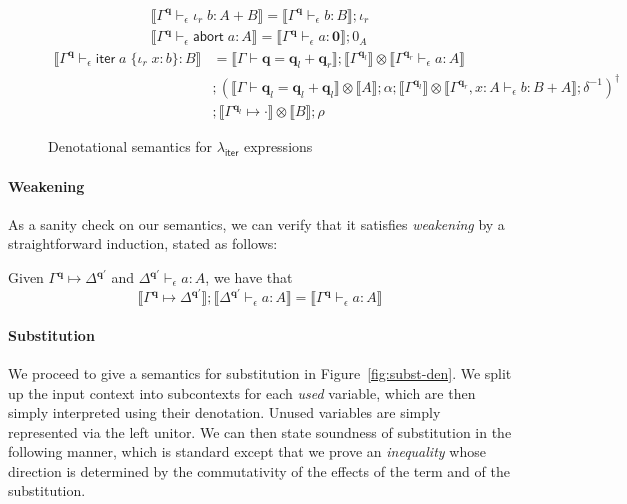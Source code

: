 \documentclass[acmsmall,screen,review]{acmart}
\newcommand{\mb}[1]{\ensuremath{\mathbf{#1}}}
\newcommand{\ms}[1]{\ensuremath{\mathsf{#1}}}
\newcommand{\lto}{:}
\newcommand{\linr}[1]{\iota_r\;{#1}}
\newcommand{\labort}[1]{\ms{abort}\;{#1}}
\newcommand{\liter}[3]{\ms{iter}\;#1\;\{ \linr{#2} \lto #3 \}}
\newcommand{\qsp}[4]{#1 \vdash #2 = #3 + #4}
\newcommand{\cwk}[2]{#1 \mapsto #2}
\newcommand{\hasty}[4]{#1 \vdash_{#2} #3: {#4}}
\newcommand{\dnt}[1]{\llbracket{#1}\rrbracket}
\newcommand{\subiterexp}{\texorpdfstring{\(\lambda_{\ms{iter}}\)}{lambda-iter}}
\begin{document}
\begin{figure}
\begin{adjustbox}{minipage=1.1\textwidth,scale=0.9}
\begin{gather*}
    \dnt{\hasty{\Gamma^{\mb{q}}}{\epsilon}{\linr{b}}{A + B}}
    = \dnt{\hasty{\Gamma^{\mb{q}}}{\epsilon}{b}{B}} ; \iota_r \\
    \dnt{\hasty{\Gamma^{\mb{q}}}{\epsilon}{\labort{a}}{A}}
    = \dnt{\hasty{\Gamma^{\mb{q}}}{\epsilon}{a}{\mb{0}}} ; 0_A
  \end{gather*}
  \begin{align*}
    \dnt{\hasty{\Gamma^{\mb{q}}}{\epsilon}{\liter{a}{x}{b}}{B}}
    &= 
    \dnt{\qsp{\Gamma}{\mb{q}}{\mb{q}_l}{\mb{q}_r}}
    ; \dnt{\Gamma^{\mb{q}_l}}
      \otimes \dnt{\hasty{\Gamma^{\mb{q}_r}}{\epsilon}{a}{A}} \\ &
    ; (
      \dnt{\qsp{\Gamma}{\mb{q}_l}{\mb{q}_l}{\mb{q}_l}} \otimes \dnt{A} 
      ; \alpha
      ; \dnt{\Gamma^{\mb{q}_l}} 
        \otimes \dnt{\hasty{\Gamma^{\mb{q}_r}, x : A}{\epsilon}{b}{B + A}}
      ; \delta^{-1}
    )^\dagger \\ &
    ; \dnt{\cwk{\Gamma^{\mb{q}_l}}{\cdot}} \otimes \dnt{B}
    ; \rho
  \end{align*}
  \end{adjustbox}
  \caption{Denotational semantics for \subiterexp{} expressions}
  \Description{}
  \label{fig:expr-densem}
\end{figure}

\paragraph{Weakening}

As a sanity check on our semantics, we can verify that it satisfies \emph{weakening} by a
straightforward induction, stated as follows:
\begin{lemma}[Weakening]
  Given $\cwk{\Gamma^{\mb{q}}}{\Delta^{\mb{q}'}}$ and
  $\hasty{\Delta^{\mb{q}'}}{\epsilon}{a}{A}$, we have that
  $$
  \dnt{\cwk{\Gamma^{\mb{q}}}{\Delta^{\mb{q}'}}} ; \dnt{\hasty{\Delta^{\mb{q}'}}{\epsilon}{a}{A}}
  = \dnt{\hasty{\Gamma^{\mb{q}}}{\epsilon}{a}{A}}
  $$
\end{lemma}

\paragraph{Substitution}

We proceed to give a semantics for substitution in Figure~\ref{fig:subst-den}. We split up the input
context into subcontexts for each \emph{used} variable, which are then simply interpreted using
their denotation. Unused variables are simply represented via the left unitor. We can then state
soundness of substitution in the following manner, which is standard except that we prove an
\emph{inequality} whose direction is determined by the commutativity of the effects of the term and
of the substitution. 
\end{document}

